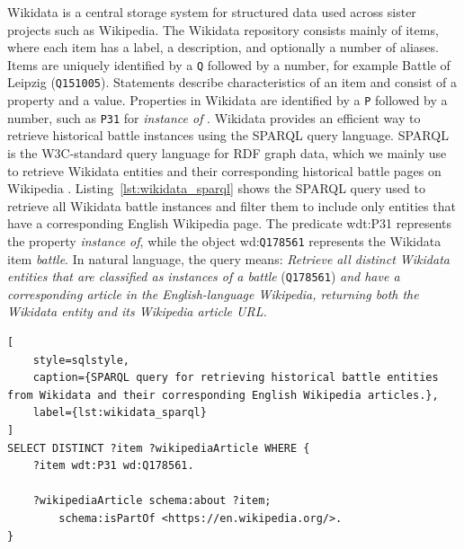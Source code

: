 Wikidata is a central storage system for structured data used across sister projects such as Wikipedia. The Wikidata repository consists mainly of items, where each item has a label, a description, and optionally a number of aliases. Items are uniquely identified by a \texttt{Q} followed by a number, for example Battle of Leipzig (\texttt{Q151005}). Statements describe characteristics of an item and consist of a property and a value. Properties in Wikidata are identified by a \texttt{P} followed by a number, such as \texttt{P31} for \textit{instance of} \citep{wikidata2026introduction}. Wikidata provides an efficient way to retrieve historical battle instances using the SPARQL query language. SPARQL is the W3C-standard query language for RDF graph data, which we mainly use to retrieve Wikidata entities and their corresponding historical battle pages on Wikipedia \citep{harris2013sparql}. Listing~\ref{lst:wikidata_sparql} shows the SPARQL query used to retrieve all Wikidata battle instances and filter them to include only entities that have a corresponding English Wikipedia page. The predicate wdt:P31 represents the property \textit{instance of}, while the object wd:\texttt{Q178561} represents the Wikidata item \textit{battle}. In natural language, the query means: \textit{Retrieve all distinct Wikidata entities that are classified as instances of a battle} (\texttt{Q178561}) \textit{and have a corresponding article in the English-language Wikipedia, returning both the Wikidata entity and its Wikipedia article URL.}

\begin{minipage}{\textwidth}
\begin{lstlisting}[
    style=sqlstyle,
    caption={SPARQL query for retrieving historical battle entities from Wikidata and their corresponding English Wikipedia articles.},
    label={lst:wikidata_sparql}
]
SELECT DISTINCT ?item ?wikipediaArticle WHERE {
    ?item wdt:P31 wd:Q178561.

    ?wikipediaArticle schema:about ?item;
        schema:isPartOf <https://en.wikipedia.org/>.
}
\end{lstlisting}
\end{minipage}

